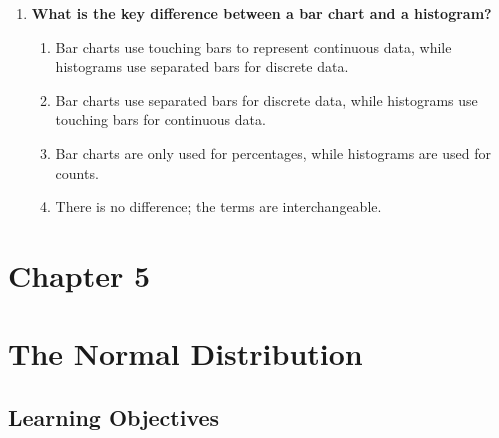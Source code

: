 \documentclass[
  letterpaper,
  DIV=11,
  numbers=noendperiod]{scrreprt}
\begin{document}
\begin{enumerate}
  \begin{enumerate}
  \def\labelenumii{\alph{enumii}.}
  \item
    They simplify relationships between variables visually.
  \item
    They display trends and patterns intuitively.
  \item
    They highlight outliers in large datasets.
  \item
    They summarize data with precise values for comparison.
  \end{enumerate}
\item
  \textbf{What is the key difference between a bar chart and a
  histogram?}

  \begin{enumerate}
  \def\labelenumii{\alph{enumii}.}
  \item
    Bar charts use touching bars to represent continuous data, while
    histograms use separated bars for discrete data.
  \item
    Bar charts use separated bars for discrete data, while histograms
    use touching bars for continuous data.
  \item
    Bar charts are only used for percentages, while histograms are used
    for counts.
  \item
    There is no difference; the terms are interchangeable.
  \end{enumerate}
\end{enumerate}


\chapter{Chapter 5}\label{chapter-5}


\chapter*{The Normal Distribution}\label{the-normal-distribution}


\section*{Learning Objectives}\label{learning-objectives-4}
\end{document}
